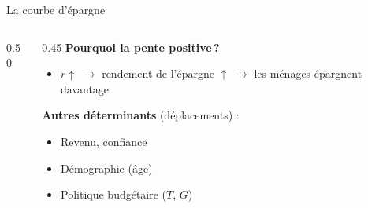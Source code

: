 \documentclass[aspectratio=169]{beamer}
\begin{document}
\begin{frame}[t]{La courbe d'épargne}\examtag
   \begin{columns}[T]
      \begin{column}{0.50\textwidth}
         \centering
      \end{column}
      \begin{column}{0.45\textwidth}
         \small
         \vspace{0.3cm}
         \textbf{Pourquoi la pente positive\,?}
         \vspace{0.2cm}
         \begin{itemize}
            \setlength\itemsep{0.2cm}
            \item $r \uparrow$ $\to$ rendement de l'épargne $\uparrow$ $\to$ les ménages épargnent davantage
         \end{itemize}
         \vspace{0.3cm}
         \textbf{Autres déterminants} (déplacements) :
         \vspace{0.1cm}
         \begin{itemize}
            \setlength\itemsep{0.12cm}
            \item Revenu, confiance
            \item Démographie (âge)
            \item Politique budgétaire ($T$, $G$)
         \end{itemize}
      \end{column}
   \end{columns}
\end{frame}
\end{document}

